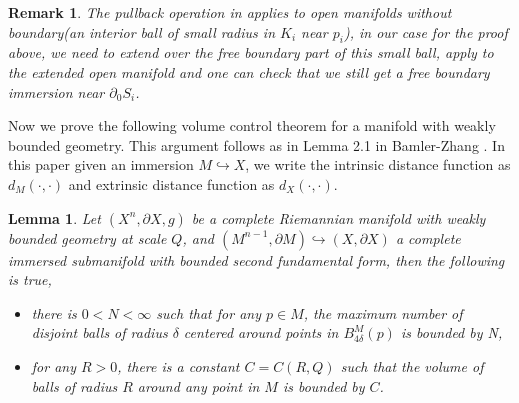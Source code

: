 \documentclass[12pt]{amsart}
\newcommand{\p}{\partial}
\newtheorem{lemma}[theorem]{Lemma}
\newtheorem{remark}[theorem]{Remark}
\numberwithin{equation}{section}
\begin{document}
	\begin{remark}
		The pullback operation in \cite{ChodoLiStryk2022-CompleteStableMinimal} applies to open manifolds without boundary(an interior ball of small radius in $K_i$ near $p_i$), in our case for the proof above, we need to extend over the free boundary part of this small ball, apply \cite{ChodoLiStryk2022-CompleteStableMinimal} to the extended open manifold and one can check that we still get a free boundary immersion near $\p_0 S_i$.
	\end{remark}

    Now we prove the following volume control theorem for a manifold with weakly bounded geometry. This argument follows as in Lemma 2.1 in Bamler-Zhang \cite{BamleZhang2015-HeatKernelCurvature}.
	In this paper given an immersion $M \hookrightarrow X$, we write the intrinsic distance function as $d_M(\cdot,\cdot)$ and extrinsic distance function as $d_X(\cdot,\cdot)$.
    \begin{lemma} \label{WBGvol}
        Let $(X^n,\partial X,g)$ be a complete Riemannian manifold with weakly bounded geometry at scale $Q$, and $(M^{n-1},\p M) \hookrightarrow (X,\p X)$ a complete immersed submanifold with bounded second fundamental form, then the following is true,
        \begin{itemize}
            \item there is $0<N<\infty$ such that for any $p\in M$, the maximum number of disjoint balls of radius $\delta$ centered around points in $B^M_{4\delta}(p)$ is bounded by N,
            \item for any $R>0$, there is a constant $C=C(R,Q)$ such that the volume of balls of radius $R$ around any point in $M$ is bounded by $C$.
        \end{itemize}
    \end{lemma}
    
\end{document}

